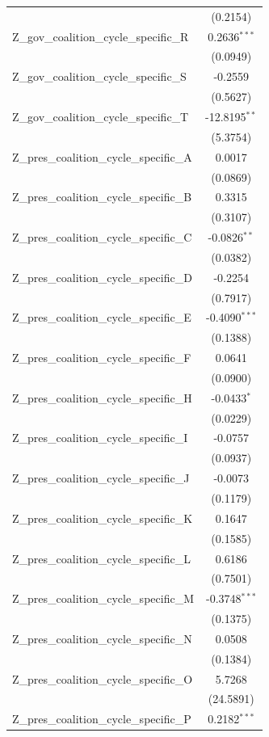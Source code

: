 \begin{tabular}{lc}
 & (0.2154) \\
Z\_gov\_coalition\_cycle\_specific\_R & 0.2636$^{***}$ \\
 & (0.0949) \\
Z\_gov\_coalition\_cycle\_specific\_S & -0.2559 \\
 & (0.5627) \\
Z\_gov\_coalition\_cycle\_specific\_T & -12.8195$^{**}$ \\
 & (5.3754) \\
Z\_pres\_coalition\_cycle\_specific\_A & 0.0017 \\
 & (0.0869) \\
Z\_pres\_coalition\_cycle\_specific\_B & 0.3315 \\
 & (0.3107) \\
Z\_pres\_coalition\_cycle\_specific\_C & -0.0826$^{**}$ \\
 & (0.0382) \\
Z\_pres\_coalition\_cycle\_specific\_D & -0.2254 \\
 & (0.7917) \\
Z\_pres\_coalition\_cycle\_specific\_E & -0.4090$^{***}$ \\
 & (0.1388) \\
Z\_pres\_coalition\_cycle\_specific\_F & 0.0641 \\
 & (0.0900) \\
Z\_pres\_coalition\_cycle\_specific\_H & -0.0433$^{*}$ \\
 & (0.0229) \\
Z\_pres\_coalition\_cycle\_specific\_I & -0.0757 \\
 & (0.0937) \\
Z\_pres\_coalition\_cycle\_specific\_J & -0.0073 \\
 & (0.1179) \\
Z\_pres\_coalition\_cycle\_specific\_K & 0.1647 \\
 & (0.1585) \\
Z\_pres\_coalition\_cycle\_specific\_L & 0.6186 \\
 & (0.7501) \\
Z\_pres\_coalition\_cycle\_specific\_M & -0.3748$^{***}$ \\
 & (0.1375) \\
Z\_pres\_coalition\_cycle\_specific\_N & 0.0508 \\
 & (0.1384) \\
Z\_pres\_coalition\_cycle\_specific\_O & 5.7268 \\
 & (24.5891) \\
Z\_pres\_coalition\_cycle\_specific\_P & 0.2182$^{***}$ \\

\end{tabular}
